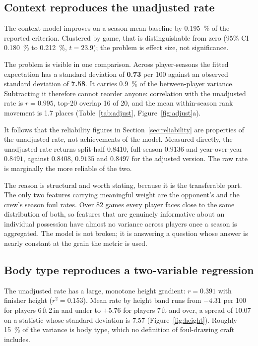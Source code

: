 \documentclass[11pt,letterpaper]{article}
\begin{document}
\subsection{Context reproduces the unadjusted rate}

The context model improves on a season-mean baseline by \SI{0.195}{\percent} of
the reported criterion. Clustered by game, that is distinguishable from zero
(95\% CI \SI{0.180}{\percent} to \SI{0.212}{\percent}, $t = 23.9$); the problem
is effect size, not significance.

The problem is visible in one comparison. Across player-seasons the fitted
expectation has a standard deviation of \textbf{0.73} per 100 against an observed
standard deviation of \textbf{7.58}. It carries \SI{0.9}{\percent} of the
between-player variance. Subtracting it therefore cannot reorder anyone:
correlation with the unadjusted rate is $r = 0.995$, top-20 overlap 16 of 20, and
the mean within-season rank movement is 1.7 places (Table~\ref{tab:adjust},
Figure~\ref{fig:adjust}a).

It follows that the reliability figures in Section~\ref{sec:reliability} are
properties of the unadjusted rate, not achievements of the model. Measured
directly, the unadjusted rate returns split-half $0.8410$, full-season $0.9136$
and year-over-year $0.8491$, against $0.8408$, $0.9135$ and $0.8497$ for the
adjusted version. The raw rate is marginally the more reliable of the two.

The reason is structural and worth stating, because it is the transferable part.
The only two features carrying meaningful weight are the opponent's and the
crew's season foul rates. Over 82 games every player faces close to the same
distribution of both, so features that are genuinely informative about an
individual possession have almost no variance across players once a season is
aggregated. The model is not broken; it is answering a question whose answer is
nearly constant at the grain the metric is used.

\subsection{Body type reproduces a two-variable regression}

The unadjusted rate has a large, monotone height gradient: $r = 0.391$ with
finisher height ($r^2 = 0.153$). Mean rate by height band runs from $-4.31$ per
100 for players 6\,ft\,2\,in and under to $+5.76$ for players 7\,ft and over, a
spread of $10.07$ on a statistic whose standard deviation is $7.57$
(Figure~\ref{fig:height}). Roughly \SI{15}{\percent} of the variance is body
type, which no definition of foul-drawing craft includes.
\end{document}
